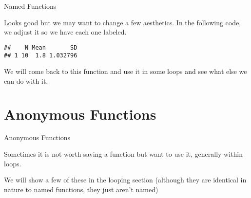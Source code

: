 \begin{frame}[fragile]{Named Functions}

Looks good but we may want to change a few aesthetics. In the following
code, we adjust it so we have each one labeled.

\begin{Shaded}
\begin{Highlighting}[]
\StringTok{ }\NormalTok{)\{}
\StringTok{ }
\StringTok{ }
\StringTok{ }
  
\StringTok{ }
\NormalTok{\}}
\end{Highlighting}
\end{Shaded}

\begin{verbatim}
##    N Mean       SD
## 1 10  1.8 1.032796
\end{verbatim}

We will come back to this function and use it in some loops and see what
else we can do with it.

\end{frame}

\section{Anonymous Functions}\label{anonymous-functions}

\begin{frame}[fragile]{Anonymous Functions}

Sometimes it is not worth saving a function but want to use it,
generally within loops.

\begin{Shaded}
\begin{Highlighting}[]
\end{Highlighting}
\end{Shaded}

We will show a few of these in the looping section (although they are
identical in nature to named functions, they just aren't named)

\end{frame}

